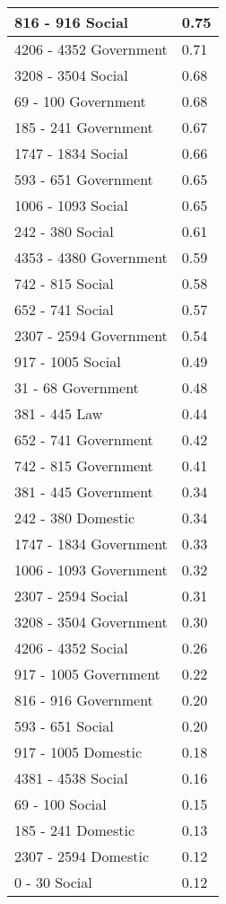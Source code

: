 \documentclass{article}
\begin{document}
\begin{longtable}{ll}
816 - 916 Social & 0.75 \\ \hline
4206 - 4352 Government & 0.71 \\ \hline
3208 - 3504 Social & 0.68 \\ \hline
69 - 100 Government & 0.68 \\ \hline
185 - 241 Government & 0.67 \\ \hline
1747 - 1834 Social & 0.66 \\ \hline
593 - 651 Government & 0.65 \\ \hline
1006 - 1093 Social & 0.65 \\ \hline
242 - 380 Social & 0.61 \\ \hline
4353 - 4380 Government & 0.59 \\ \hline
742 - 815 Social & 0.58 \\ \hline
652 - 741 Social & 0.57 \\ \hline
2307 - 2594 Government & 0.54 \\ \hline
917 - 1005 Social & 0.49 \\ \hline
31 - 68 Government & 0.48 \\ \hline
381 - 445 Law & 0.44 \\ \hline
652 - 741 Government & 0.42 \\ \hline
742 - 815 Government & 0.41 \\ \hline
381 - 445 Government & 0.34 \\ \hline
242 - 380 Domestic & 0.34 \\ \hline
1747 - 1834 Government & 0.33 \\ \hline
1006 - 1093 Government & 0.32 \\ \hline
2307 - 2594 Social & 0.31 \\ \hline
3208 - 3504 Government & 0.30 \\ \hline
4206 - 4352 Social & 0.26 \\ \hline
917 - 1005 Government & 0.22 \\ \hline
816 - 916 Government & 0.20 \\ \hline
593 - 651 Social & 0.20 \\ \hline
917 - 1005 Domestic & 0.18 \\ \hline
4381 - 4538 Social & 0.16 \\ \hline
69 - 100 Social & 0.15 \\ \hline
185 - 241 Domestic & 0.13 \\ \hline
2307 - 2594 Domestic & 0.12 \\ \hline
0 - 30 Social & 0.12 \\ \hline

\end{longtable}
\end{document}
